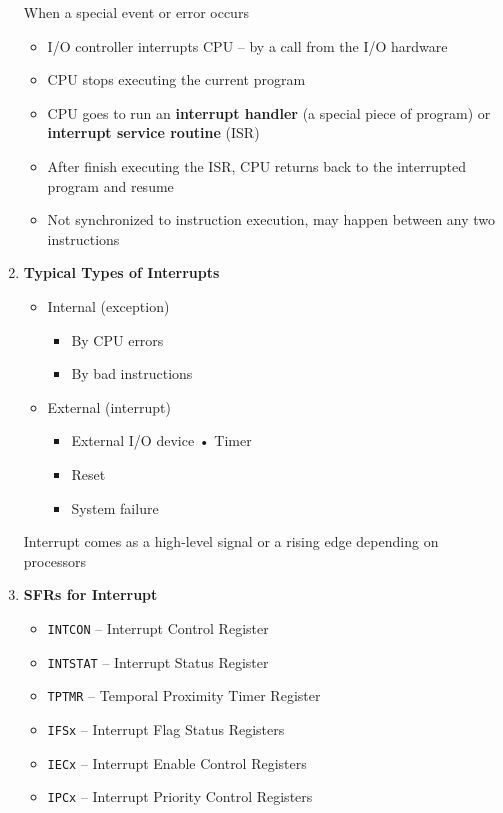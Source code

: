 \documentclass[a4paper]{article}
\begin{document}
\begin{enumerate}[label = \arabic*.]
      \par When a special event or error occurs
      \begin{itemize}[leftmargin = 1cm]
        \item I/O controller interrupts CPU -- by a call from the I/O hardware
        \item CPU stops executing the current program
        \item CPU goes to run an \textbf{interrupt handler} (a special piece of program) or \textbf{interrupt service routine} (ISR)
        \item After finish executing the ISR, CPU returns back to the interrupted program and resume
        \item Not synchronized to instruction execution, may happen between any two instructions
      \end{itemize}
    \item \textbf{Typical Types of Interrupts}
      \begin{itemize}[leftmargin = 1cm]
        \item Internal (exception)
          \begin{itemize}[leftmargin = 1cm]
            \item By CPU errors
            \item By bad instructions
          \end{itemize}
        \item External (interrupt)
          \begin{itemize}[leftmargin = 1cm]
            \item External I/O device • Timer
            \item Reset
            \item System failure
          \end{itemize}
      \end{itemize}
      \par Interrupt comes as a high-level signal or a rising edge depending on processors

    \item \textbf{SFRs for Interrupt}
      \begin{itemize}[leftmargin = 1cm]
        \item \verb|INTCON| -- Interrupt Control Register
        \item \verb|INTSTAT| -- Interrupt Status Register
        \item \verb|TPTMR| -- Temporal Proximity Timer Register
        \item \verb|IFSx| -- Interrupt Flag Status Registers
        \item \verb|IECx| -- Interrupt Enable Control Registers
        \item \verb|IPCx| -- Interrupt Priority Control Registers
      \end{itemize}


\end{enumerate}
\end{document}
